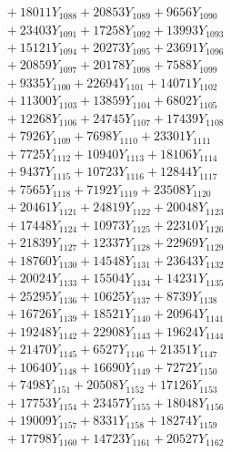 \documentclass[a4paper,10pt]{article}
\begin{document}
{\begin{align}
&\;  + 18011 Y_{1088} + 20853 Y_{1089} + 9656 Y_{1090} \\[0.3ex]
&\;  + 23403 Y_{1091} + 17258 Y_{1092} + 13993 Y_{1093} \\[0.3ex]
&\;  + 15121 Y_{1094} + 20273 Y_{1095} + 23691 Y_{1096} \\[0.3ex]
&\;  + 20859 Y_{1097} + 20178 Y_{1098} + 7588 Y_{1099} \\[0.3ex]
&\;  + 9335 Y_{1100} + 22694 Y_{1101} + 14071 Y_{1102} \\[0.3ex]
&\;  + 11300 Y_{1103} + 13859 Y_{1104} + 6802 Y_{1105} \\[0.3ex]
&\;  + 12268 Y_{1106} + 24745 Y_{1107} + 17439 Y_{1108} \\[0.5ex]\allowbreak
&\;  + 7926 Y_{1109} + 7698 Y_{1110} + 23301 Y_{1111} \\[0.3ex]
&\;  + 7725 Y_{1112} + 10940 Y_{1113} + 18106 Y_{1114} \\[0.3ex]
&\;  + 9437 Y_{1115} + 10723 Y_{1116} + 12844 Y_{1117} \\[0.3ex]
&\;  + 7565 Y_{1118} + 7192 Y_{1119} + 23508 Y_{1120} \\[0.3ex]
&\;  + 20461 Y_{1121} + 24819 Y_{1122} + 20048 Y_{1123} \\[0.3ex]
&\;  + 17448 Y_{1124} + 10973 Y_{1125} + 22310 Y_{1126} \\[0.3ex]
&\;  + 21839 Y_{1127} + 12337 Y_{1128} + 22969 Y_{1129} \\[0.3ex]
&\;  + 18760 Y_{1130} + 14548 Y_{1131} + 23643 Y_{1132} \\[0.3ex]
&\;  + 20024 Y_{1133} + 15504 Y_{1134} + 14231 Y_{1135} \\[0.3ex]
&\;  + 25295 Y_{1136} + 10625 Y_{1137} + 8739 Y_{1138} \\[0.5ex]\allowbreak
&\;  + 16726 Y_{1139} + 18521 Y_{1140} + 20964 Y_{1141} \\[0.3ex]
&\;  + 19248 Y_{1142} + 22908 Y_{1143} + 19624 Y_{1144} \\[0.3ex]
&\;  + 21470 Y_{1145} + 6527 Y_{1146} + 21351 Y_{1147} \\[0.3ex]
&\;  + 10640 Y_{1148} + 16690 Y_{1149} + 7272 Y_{1150} \\[0.3ex]
&\;  + 7498 Y_{1151} + 20508 Y_{1152} + 17126 Y_{1153} \\[0.3ex]
&\;  + 17753 Y_{1154} + 23457 Y_{1155} + 18048 Y_{1156} \\[0.3ex]
&\;  + 19009 Y_{1157} + 8331 Y_{1158} + 18274 Y_{1159} \\[0.3ex]
&\;  + 17798 Y_{1160} + 14723 Y_{1161} + 20527 Y_{1162} \\[0.3ex]

\end{align}}
\end{document}
